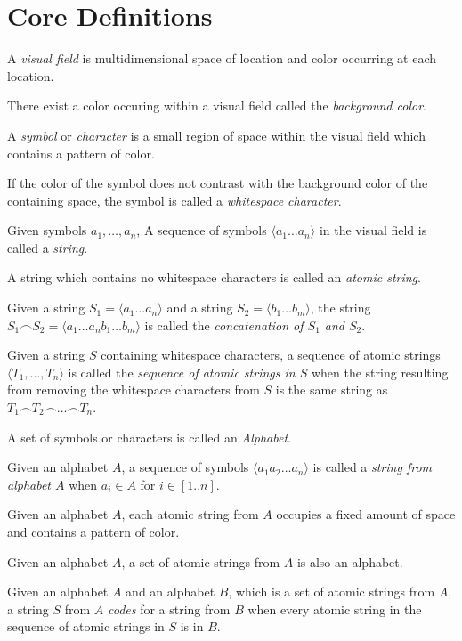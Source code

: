 \documentclass{article}
\newcommand{\nl}{\bigskip\noindent}
\newcommand{\seq}[1]{\langle #1\rangle}
\newcommand{\defcon}[1]{\emph{#1}}
\newcommand{\seqcat}{\frown}
\begin{document}
\section{Core Definitions}

\nl A \defcon{visual field} is multidimensional space of location and color occurring at each location. 

\nl There exist a color occuring within a visual field called the \defcon{background color}.

\nl A \defcon{symbol} or \defcon{character} is a small region of space within the visual field which contains a pattern of color.  

\nl If the color of the symbol does not contrast with the background color of the containing space, the symbol is called a \defcon{whitespace character}.  

\nl Given symbols $a_1, \dots, a_n$, A sequence of symbols $\seq{a_1\dots a_n}$ in the visual field is called a \defcon{string}.

\nl A string which contains no whitespace characters is called an \defcon{atomic string}.

\nl Given a string $S_1= \seq{a_1\dots a_n}$ and a string $S_2 = \seq{b_1\dots b_m}$, the string $S_1\seqcat S_2 = \seq{a_1\dots a_nb_1\dots b_m}$ is called the \defcon{concatenation of $S_1$ and $S_2$}.

\nl Given a string $S$ containing whitespace characters, a sequence of atomic strings $\seq{T_1,\dots, T_n}$ is called the \defcon{sequence of atomic strings in $S$} when the string resulting from removing the whitespace characters from $S$ is the same string as $T_1\seqcat T_2\seqcat\dots \seqcat T_n$.

\nl A set of symbols or characters is called an \defcon{Alphabet}.

\nl Given an alphabet $A$, a sequence of symbols $\seq{a_1a_2\dots a_n}$  is called a \defcon{string from alphabet $A$}  when  $a_i\in A$ for $i\in[1..n]$.

\nl Given an alphabet $A$, each atomic string from $A$ occupies a fixed amount of space and contains a pattern of color.   

\nl Given an alphabet $A$, a set of atomic strings from $A$ is also an alphabet. 


\nl Given an alphabet $A$ and an alphabet $B$, which is a set of atomic strings from $A$, a string $S$ from $A$ \defcon{codes} for a string from $B$ when every atomic string in the sequence of atomic strings in $S$ is in $B$. 


 
\end{document}
